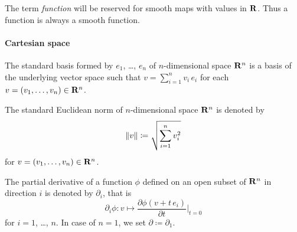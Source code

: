 The term \emph{function} will be reserved for smooth maps with values in $\mathbf{R}$.
Thus a function is always a smooth function.

\paragraph{Cartesian space}
The standard basis formed by $e_1$, \dots, $e_n$ of $n$-dimensional space $\mathbf{R}^n$ is
a basis of the underlying vector space such that $v = \sum_{i = 1}^n v_i \, e_i
$ for each $v = (v_1, \dotsc, v_n) \in \mathbf{R}^n$. 

The standard Euclidean norm of $n$-dimensional space $\mathbf{R}^n$ is denoted
by
\[
    \lVert v\rVert \coloneqq \sqrt{\sum_{i = 1}^n v_i^2}
\]
for $v = (v_1, \dotsc, v_n) \in \mathbf{R}^n$.

The partial derivative of a function $\phi$ defined on an open subset of $\mathbf{R}^n$
in direction $i$ is denoted by $\partial_i$, that is
\[
  \partial_i \phi\colon v \mapsto \frac{\partial \phi(v + t \, e_i)}{\partial t}|_{t = 0}
\]
for $i = 1$, \dots, $n$. In case of $n = 1$, we set $\partial \coloneqq \partial_1$.

